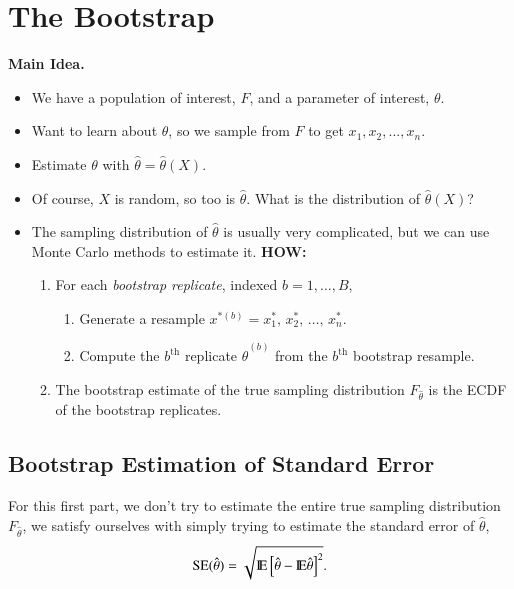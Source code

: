 \documentclass[11pt,english]{scrbook}
\begin{document}
\section{The Bootstrap}
\label{sec:org392bcb4}


\textbf{Main Idea.}
\begin{itemize}
\item We have a population of interest, \(F\), and a parameter of interest, \(\theta\).

\item Want to learn about \(\theta\), so we sample from \(F\) to get \(x_{1}, x_{2}, ..., x_{n}\).

\item Estimate \(\theta\) with \(\hat{\theta} = \hat{\theta}(X)\).

\item Of course, \(X\) is random, so too is \(\hat{\theta}\).  What is the distribution of \(\hat{\theta}(X)\)?

\item The sampling distribution of \(\hat{\theta}\) is usually very complicated, but we can use Monte Carlo methods to estimate it.  \textbf{HOW:}
\begin{enumerate}
\item For each \emph{bootstrap replicate}, indexed \(b = 1, \ldots, B\),
\begin{enumerate}
\item Generate a resample \(x^{\ast(b)}= x_{1}^{\ast},\,x_{2}^{\ast},\,\ldots,\,x_{n}^{\ast}\).
\item Compute the \(b^{\mathrm{th}}\) replicate \(\hat{\theta}^{(b)}\) from the \(b^{\mathrm{th}}\) bootstrap resample.
\end{enumerate}
\item The bootstrap estimate of the true sampling distribution \(F_{\hat{\theta}}\) is the ECDF of the bootstrap replicates.
\end{enumerate}
\end{itemize}


\subsection{Bootstrap Estimation of Standard Error}
\label{sec:orgfc9c777}

For this first part, we don't try to estimate the entire true sampling distribution \(F_{\hat{\theta}}\), we satisfy ourselves with simply trying to estimate the standard error of \(\hat{\theta}\),
\[
\mathrm{SE}(\hat{\theta})=\sqrt{ \mathrm{I\hspace{-1.5pt}E} \left[\hat{\theta} - \mathrm{I\hspace{-1.5pt}E}\hat{\theta}  \right]^{2}}.
\]
\end{document}

